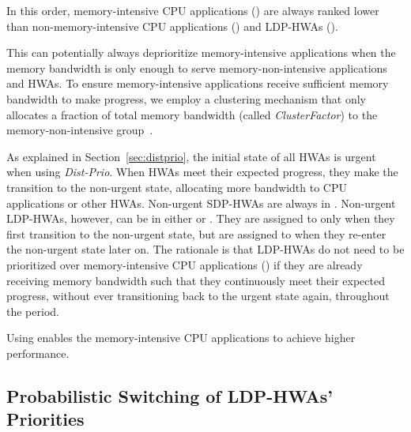 \documentclass[10pt,letterpaper]{article}
\newcommand{\TMP}[1]{#1}
\newif\ifOPTION
\begin{document}
\ifOPTION
The current scheduling order allows HWAs to receive high priority when they
becomes urgent (i.e., not meeting their expected progress). This prevents them 
from missing deadlines due to interference from CPU applications. Memory-intensive CPU applications
() are always ranked lower than memory-non-intensive CPU applications
() and LDP-HWAs ().
\else
In this order, memory-intensive CPU applications
() are always ranked lower than non-memory-intensive CPU applications
() and LDP-HWAs (). 
\fi
This can potentially always deprioritize memory-intensive
applications when the memory bandwidth is only enough to serve memory-non-intensive
applications and HWAs. To ensure memory-intensive applications receive sufficient memory
bandwidth to make progress, we employ a clustering mechanism that only allocates
a fraction of total memory bandwidth (called \emph{ClusterFactor}) to the memory-non-intensive 
group~\cite{tcm}.

\TMP{As explained in Section~\ref{sec:distprio}, the initial state of all HWAs is
urgent when using \emph{Dist-Prio}. When HWAs meet their expected progress, they make the
transition to the non-urgent state, allocating more bandwidth to CPU
applications or other HWAs. }
Non-urgent SDP-HWAs are always in . Non-urgent LDP-HWAs, however, can be in
either  or . They are assigned to  only
when they first transition to the non-urgent state, but are assigned to 
when they re-enter the non-urgent state later on. The rationale is that LDP-HWAs
do not need to be prioritized over memory-intensive CPU applications ()
if they are already receiving memory bandwidth such that they continuously meet
their expected progress, without ever transitioning back to the urgent state
again, throughout the period.
\ifOPTION
{This kind of a priority scheme enables LDP-HWAs to make progress while not over-consuming memory
bandwidth and enables memory-intensive CPU applications to achieve
higher performance.}
\else
Using  enables the memory-intensive CPU applications to achieve
higher performance.
\fi

















\subsection{Probabilistic Switching of LDP-HWAs' Priorities}
\label{sec:prob-switching}
\end{document}
